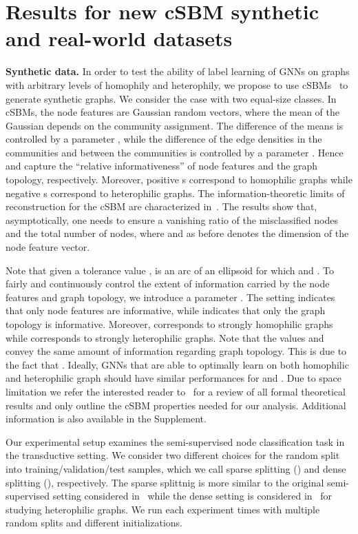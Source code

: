 \documentclass{article} \usepackage{iclr2021_conference,times}
\begin{document}
\section{Results for new cSBM synthetic and real-world datasets}\label{sec:cSBM_intro}

\textbf{Synthetic data. } In order to test the ability of label learning of GNNs on graphs with arbitrary levels of homophily and heterophily, we propose to use cSBMs~\citep{deshpande2018contextual} to generate synthetic graphs. We consider the case with two equal-size classes. In cSBMs, the node features are Gaussian random vectors, where the mean of the Gaussian depends on the community assignment. The difference of the means is controlled by a parameter , while the difference of the edge densities in the communities and between the communities is controlled by a parameter . Hence  and  capture the ``relative informativeness'' of node features and the graph topology, respectively. Moreover, positive s correspond to homophilic graphs while negative s correspond to heterophilic graphs. The information-theoretic limits of reconstruction for the cSBM are characterized in~\cite{deshpande2018contextual}. The results show that, asymptotically, one needs  to ensure a vanishing ratio of the misclassified nodes and the total number of nodes, where  and  as before denotes the dimension of the node feature vector.

Note that given a tolerance value ,  is an arc of an ellipsoid for which  and . To fairly and continuously control the extent of information carried by the node features and graph topology, we introduce a parameter . The setting  indicates that only node features are informative, while  indicates that only the graph topology is informative. Moreover,  corresponds to strongly homophilic graphs while  corresponds to strongly heterophilic graphs. Note that the values  and  convey the same amount of information regarding graph topology. This is due to the fact that . Ideally, GNNs that are able to optimally learn on both homophilic and heterophilic graph should have similar performances for  and . Due to space limitation we refer the interested reader to~\citep{deshpande2018contextual} for a review of all formal theoretical results and only outline the cSBM properties needed for our analysis. Additional information is also available in the Supplement.

Our experimental setup examines the semi-supervised node classification task in the transductive setting. We consider two different choices for the random split into training/validation/test samples, which we call sparse splitting () and dense splitting (), respectively. The sparse splittnig is more similar to the original semi-supervised setting considered in~\citet{kipf2017semi} while the dense setting is considered in~\citet{pei2019geom} for studying heterophilic graphs. We run each experiment  times with multiple random splits and different initializations.
\end{document}

